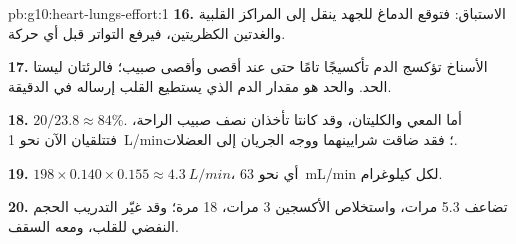\begin{solution}{pb:g10:heart-lungs-effort:1}
\textbf{16.} الاستباق: فتوقع الدماغ للجهد ينقل إلى المراكز القلبية
والغدتين الكظريتين، فيرفع التواتر قبل أي حركة.

\textbf{17.} الأسناخ تؤكسج الدم تأكسيجًا تامًا حتى عند أقصى  وأقصى
صبيب؛ فالرئتان ليستا الحد. والحد هو مقدار الدم الذي يستطيع القلب
إرساله في الدقيقة.

\textbf{18.} $20/23.8 \approx 84\%$. أما المعي والكليتان، وقد كانتا
تأخذان نصف صبيب الراحة، فتتلقيان الآن نحو \qty{1}{L/min}؛ فقد ضاقت
شرايينهما ووجه الجريان إلى العضلات.

\textbf{19.} $198 \times 0.140 \times 0.155 \approx \qty{4.3}{L/min}$،
أي نحو \qty{63}{mL/min} لكل كيلوغرام.

\textbf{20.} تضاعف  5.3 مرات، واستخلاص الأكسجين 3 مرات،
 18 مرة؛ وقد غيّر التدريب الحجم النفضي للقلب، ومعه السقف.
\end{solution}
